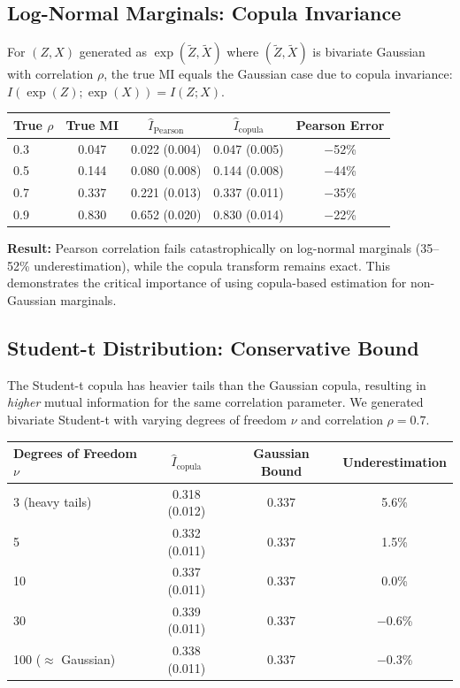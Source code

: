 \documentclass[10pt]{article} %
\theoremstyle{plain}
\theoremstyle{definition}
\newcommand{\MI}{I}
\begin{document}
\subsection{Log-Normal Marginals: Copula Invariance}

For $(Z, X)$ generated as $\exp(\tilde{Z}, \tilde{X})$ where $(\tilde{Z}, \tilde{X})$ is bivariate Gaussian with correlation $\rho$, the true MI equals the Gaussian case due to copula invariance: $\MI(\exp(Z); \exp(X)) = \MI(Z; X)$.

\begin{center}
\begin{tabular}{lcccc}
\toprule
True $\rho$ & True MI & $\widehat{\MI}_{\text{Pearson}}$ & $\widehat{\MI}_{\text{copula}}$ & Pearson Error \\
\midrule
0.3 & 0.047 & 0.022 (0.004) & 0.047 (0.005) & $-$52\% \\
0.5 & 0.144 & 0.080 (0.008) & 0.144 (0.008) & $-$44\% \\
0.7 & 0.337 & 0.221 (0.013) & 0.337 (0.011) & $-$35\% \\
0.9 & 0.830 & 0.652 (0.020) & 0.830 (0.014) & $-$22\% \\
\bottomrule
\end{tabular}
\end{center}

\textbf{Result:} Pearson correlation fails catastrophically on log-normal marginals (35--52\% underestimation), while the copula transform remains exact. This demonstrates the critical importance of using copula-based estimation for non-Gaussian marginals.

\subsection{Student-t Distribution: Conservative Bound}

The Student-t copula has heavier tails than the Gaussian copula, resulting in \emph{higher} mutual information for the same correlation parameter. We generated bivariate Student-t with varying degrees of freedom $\nu$ and correlation $\rho = 0.7$.

\begin{center}
\begin{tabular}{lccc}
\toprule
Degrees of Freedom $\nu$ & $\widehat{\MI}_{\text{copula}}$ & Gaussian Bound & Underestimation \\
\midrule
3 (heavy tails) & 0.318 (0.012) & 0.337 & 5.6\% \\
5 & 0.332 (0.011) & 0.337 & 1.5\% \\
10 & 0.337 (0.011) & 0.337 & 0.0\% \\
30 & 0.339 (0.011) & 0.337 & $-$0.6\% \\
100 ($\approx$ Gaussian) & 0.338 (0.011) & 0.337 & $-$0.3\% \\
\bottomrule
\end{tabular}
\end{center}
\end{document}

